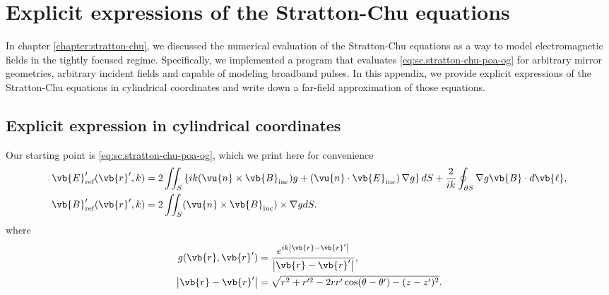 \documentclass[11pt,SymmetricalJury]{inrsthesis/inrsthesis}
\begin{document}
\chapter{Explicit expressions of the Stratton-Chu equations}
\label{app.explicit-sc}

In chapter \ref{chapter:stratton-chu}, we discussed the numerical evaluation
of the Stratton-Chu equations as a way to model electromagnetic fields in the
tightly focused regime. Specifically, we implemented a program that evaluates
\eqref{eq:sc.stratton-chu-poa-og} for arbitrary mirror geometries, arbitrary incident fields and capable
of modeling broadband pulses. In this appendix, we provide explicit expressions
of the Stratton-Chu equations in cylindrical coordinates and write down a far-field
approximation of those equations.

\section{Explicit expression in cylindrical coordinates}

Our starting point is \eqref{eq:sc.stratton-chu-poa-og}, which we print here for convenience
  \begin{subequations}
  \label{eq:app.sc-explicit.poa-og}
  \begin{align}
    \label{eq:app.sc-explicit.poa-og.efield}
    \vb{E}'_\text{ref}(\vb{r}',k)  &= 2\iint_S
      \left\{
        ik(\vu{n}\times\vb{B}_\text{inc})g
        +\left(\vu{n}\cdot\vb{E}_\text{inc}\right)\nabla g\right\}dS
            + \frac{2}{ik}\oint_{\partial S}\nabla g
                    \vb{B}\cdot d\vb{\ell},\\
    \label{eq:app.sc-explicit.poa-og.bfield}
    \vb{B}'_\text{ref}(\vb{r}',k)  &= 2\iint_S (\vu{n}\times\vb{B}_\text{inc})\times\nabla g dS.
  \end{align}
  \end{subequations}
where
  \begin{align}
    g(\vb{r},\vb{r}') &= \frac{e^{ik\left|\vb{r}-\vb{r}'\right|}}{\left|\vb{r}-\vb{r}'\right|}, \\
    \left|\vb{r}-\vb{r}'\right| &= \sqrt{r^2+r'^2-2rr'\cos(\theta-\theta')-(z-z')^2}.
  \end{align}
\end{document}
